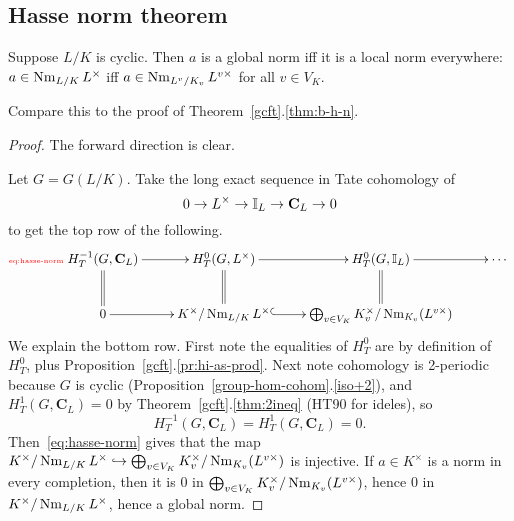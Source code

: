 \subsection{Hasse norm theorem}
\begin{thm}
Suppose $L/K$ is cyclic. Then $a$ is a global norm iff it is a local norm everywhere: $a\in \operatorname{Nm}_{L/K} L^{\times}$ iff $a\in \operatorname{Nm}_{L^v/K_v}L^{v\times}$ for all $v\in V_K$.
\end{thm}
Compare this to the proof of Theorem~\ref{gcft}.\ref{thm:b-h-n}.
\begin{proof}
The forward direction is clear.

Let $G=G(L/K)$. Take the long exact sequence in Tate cohomology of
\[
0\to L^{\times}\to \mathbb{I}_L\to \mathbf C_L\to 0
\]
to get the top row of the following.
\begin{equation}\llabel{eq:hasse-norm}
\xymatrix{
H^{-1}_T(G,\mathbf C_L)\ar@{=}[d]
\ar[r] & H_T^0(G,L^{\times}) \ar[r]\ar@{=}[d] & 
H_T^0(G,\I_L)\ar[r]\ar@{=}[d] & \cdots\\
0 \ar[r] & K^{\times} /\nm_{L/K}L^{\times} \ar@{^(->}[r]&\bigopl_{v\in V_K} K_v^{\times}/\nm_{K_v}(L^{v\times})&
}
\end{equation}
We explain the bottom row. First note the equalities of $H_T^0$ are by definition of $H_T^0$, plus Proposition~\ref{gcft}.\ref{pr:hi-as-prod}.
Next note cohomology is 2-periodic because $G$ is cyclic (Proposition~\ref{group-hom-cohom}.\ref{iso+2}), and $H_T^1(G,\mathbf C_L)=0$ by Theorem~\ref{gcft}.\ref{thm:2ineq} (HT90 for ideles), so
\[
H_T^{-1}(G,\mathbf C_L)=H_T^1(G,\mathbf C_L)=0.
\]
Then~\eqref{eq:hasse-norm} gives that the map $K^{\times} /\operatorname{Nm}_{L/K}L^{\times} \hookrightarrow \bigoplus_{v\in V_K} K_v^{\times}/\operatorname{Nm}_{K_v}(L^{v\times})$ is injective. If $a\in K^{\times}$ is a norm in every completion, then it is 0 in $\bigoplus_{v\in V_K} K_v^{\times}/\operatorname{Nm}_{K_v}(L^{v\times})$, hence 0 in $K^{\times} /\operatorname{Nm}_{L/K}L^{\times}$, hence a global norm.
\end{proof}
